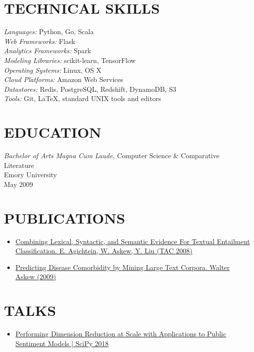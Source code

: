 \documentclass[line,margin]{res}
\begin{document}
\begin{resume}
\section{TECHNICAL SKILLS}
        {\sl Languages:} Python, Go, Scala \\
        {\sl Web Frameworks:} Flask \\
        {\sl Analytics Frameworks:} Spark \\
        {\sl Modeling Libraries:} scikit-learn, TensorFlow  \\
        {\sl Operating Systems:} Linux, OS X\\
        {\sl Cloud Platforms:} Amazon Web Services\\
        {\sl Datastores:} Redis, PostgreSQL, Redshift, DynamoDB, S3 \\
        {\sl Tools:} Git, \LaTeX, standard UNIX tools and editors

\section{EDUCATION}
        {\sl Bachelor of Arts Magna Cum Laude,}
        Computer Science \& Comparative Literature \\
        Emory University \\
        May 2009

\section{PUBLICATIONS}
\begin{itemize}
\item \href{http://www.nist.gov/tac/publications/2008/participant.papers/Emory.proceedings.pdf}{Combining Lexical, Syntactic, and Semantic Evidence For
  Textual Entailment Classification.  E. Agichtein, W. Askew, Y. Liu
  (TAC 2008)}
\item \href{https://etd.library.emory.edu/concern/etds/736664895}
  {Predicting Disease Comorbidity by Mining Large Text
    Corpora. Walter Askew (2009)}
\end{itemize}

\section{TALKS}
\begin{itemize}
  \item \href{https://www.youtube.com/watch?v=31YeSfDklfc}{Performing Dimension Reduction at Scale with Applications to Public Sentiment Models | SciPy 2018}
\end{itemize}

\end{resume}
\end{document}
